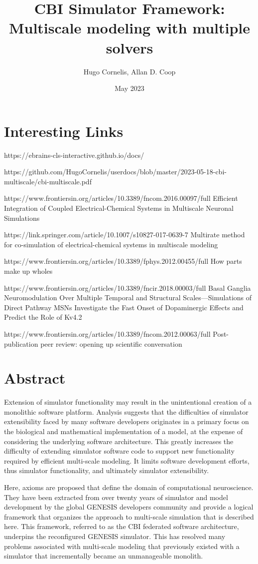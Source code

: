 \documentclass{article}
\title{CBI Simulator Framework: Multiscale modeling with multiple solvers}
\author{Hugo Cornelis, Allan D. Coop}
\date{May 2023}
\begin{document}
\maketitle

\section*{Interesting Links}

https://ebrains-cls-interactive.github.io/docs/

https://github.com/HugoCornelis/userdocs/blob/master/2023-05-18-cbi-multiscale/cbi-multiscale.pdf


https://www.frontiersin.org/articles/10.3389/fncom.2016.00097/full
Efficient Integration of Coupled Electrical-Chemical Systems in Multiscale Neuronal Simulations

https://link.springer.com/article/10.1007/s10827-017-0639-7
Multirate method for co-simulation of electrical-chemical systems in multiscale modeling

https://www.frontiersin.org/articles/10.3389/fphys.2012.00455/full
How parts make up wholes

https://www.frontiersin.org/articles/10.3389/fncir.2018.00003/full
Basal Ganglia Neuromodulation Over Multiple Temporal and Structural Scales—Simulations of Direct Pathway MSNs Investigate the Fast Onset of Dopaminergic Effects and Predict the Role of Kv4.2

https://www.frontiersin.org/articles/10.3389/fncom.2012.00063/full
Post-publication peer review: opening up scientific conversation


\section*{Abstract}

Extension of simulator functionality may result in the unintentional creation of a monolithic software platform.  Analysis suggests that the difficulties of simulator extensibility faced by many software developers originates in a primary focus on the biological and mathematical implementation of a model, at the expense of considering the underlying software architecture. This greatly increases the difficulty of extending simulator software code to support new functionality required by efficient multi-scale modeling.  It limits software development efforts, thus simulator functionality, and ultimately simulator extensibility. 

Here, axioms are proposed that define the domain of computational neuroscience. They have been extracted from over twenty years of simulator and model development by the global GENESIS developers community and provide a logical framework that organizes the approach to multi-scale simulation that is described here. This framework, referred to as the CBI federated software architecture, underpins the reconfigured GENESIS simulator.  This has resolved many problems associated with multi-scale modeling that previously existed with a simulator that incrementally became an unmanageable monolith.  
\end{document}
